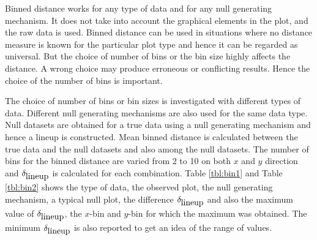 \documentclass[12]{article}
\begin{document}
Binned distance works for any type of data and for any null generating mechanism. It does not take into account the graphical elements in the plot, and the raw data is used. Binned distance can be used in situations where no distance measure is known for the particular plot type and hence it can be regarded as universal. But the choice of number of bins or the bin size highly affects the distance. A wrong choice may produce erroneous or conflicting results. Hence the choice of the number of bins is important.

The choice of number of bins or bin sizes is investigated with different types of data. Different null generating mechanisms are also used for the same data type. Null datasets are obtained for a true data using a null generating mechanism and hence a lineup is constructed. Mean binned distance is calculated between the true data and the null datasets and also among the null datasets. The number of bins for the binned distance are varied from 2 to 10 on both $x$ and $y$ direction and $\delta_{\hbox{lineup}}$ is calculated for each combination. Table \ref{tbl:bin1} and Table \ref{tbl:bin2} shows the type of data, the observed plot, the null generating mechanism, a typical null plot, the difference $\delta_{\hbox{lineup}}$ and also the maximum value of $\delta_{\hbox{lineup}}$, the $x$-bin and $y$-bin for which the maximum was obtained. The minimum $\delta_{\hbox{lineup}}$ is also reported to get an idea of the range of values.

%
%
\end{document}
